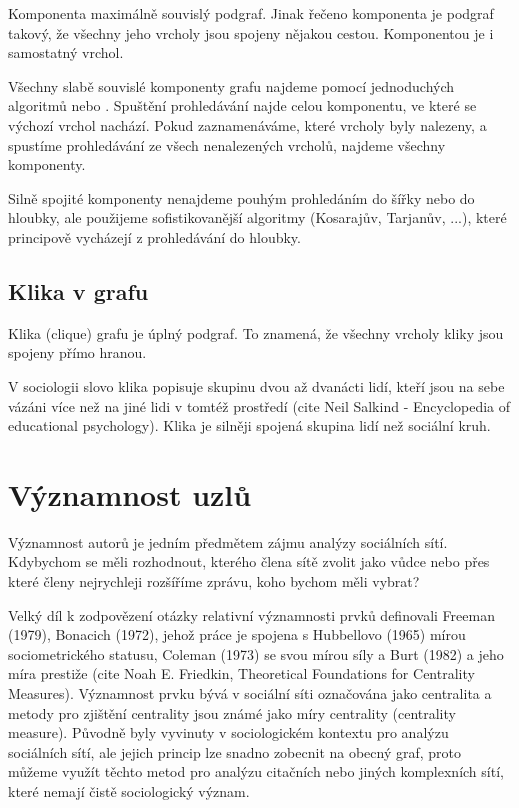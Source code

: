 \documentclass[12pt,titlepage]{report}
\begin{document}
Komponenta maximálně souvislý podgraf. Jinak řečeno komponenta je podgraf
takový, že všechny jeho vrcholy jsou spojeny nějakou cestou. Komponentou je i
samostatný vrchol.

Všechny slabě souvislé komponenty grafu najdeme pomocí jednoduchých algoritmů
 nebo . Spuštění prohledávání najde
celou komponentu, ve které se výchozí vrchol nachází. Pokud zaznamenáváme,
které vrcholy byly nalezeny, a spustíme prohledávání ze všech nenalezených
vrcholů, najdeme všechny komponenty. 

Silně spojité komponenty nenajdeme pouhým prohledáním do šířky nebo do hloubky,
ale použijeme sofistikovanější algoritmy (Kosarajův, Tarjanův, ...), které
principově vycházejí z prohledávání do hloubky.

\subsection{Klika v grafu}
Klika (clique) grafu je úplný podgraf. To znamená, že všechny vrcholy kliky
jsou spojeny přímo hranou.

V sociologii slovo klika popisuje skupinu dvou až dvanácti lidí, kteří jsou na
sebe vázáni více než na jiné lidi v tomtéž prostředí (cite Neil Salkind -
Encyclopedia of educational psychology). Klika je silněji spojená skupina lidí
než sociální kruh.

\section{Významnost uzlů}
Významnost autorů je jedním předmětem zájmu analýzy sociálních sítí. Kdybychom
se měli rozhodnout, kterého člena sítě zvolit jako vůdce nebo přes které členy
nejrychleji rozšíříme zprávu, koho bychom měli vybrat? 

Velký díl k zodpovězení otázky relativní významnosti prvků definovali Freeman
(1979), Bonacich (1972), jehož práce je spojena s Hubbellovo (1965) mírou
sociometrického statusu, Coleman (1973) se svou mírou síly a Burt (1982) a jeho
míra prestiže (cite Noah E. Friedkin, Theoretical Foundations for Centrality Measures). Významnost prvku bývá v sociální síti označována jako centralita
a metody pro zjištění centrality jsou známé jako míry centrality (centrality
measure). Původně byly vyvinuty v sociologickém kontextu pro analýzu sociálních
sítí, ale jejich princip lze snadno zobecnit na obecný graf, proto můžeme
využít těchto metod pro analýzu citačních nebo jiných komplexních sítí, které
nemají čistě sociologický význam.
\end{document}
